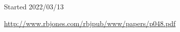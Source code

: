 \documentclass[10pt,titlepage]{article}
\begin{document}
\cite{pinker-angels}


{}





\tiny{
Started 2022/03/13


\href{http://www.rbjones.com/rbjpub/www/papers/p048.pdf}{http://www.rbjones.com/rbjpub/www/papers/p048.pdf}

}%
\end{document}
